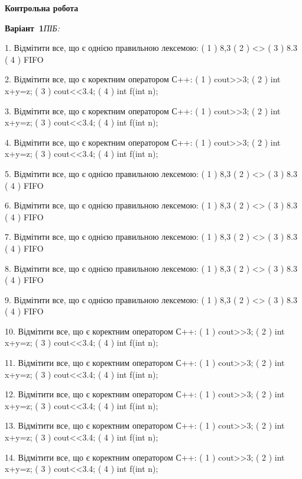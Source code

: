 \documentclass[11pt]{article}
\begin{document}
{\large\textbf{Контрольна робота}}

\textbf{Варіант \No\,1}\hfill \textit{ПІБ:}\,\underline{\hspace{60mm}}
\vspace{4mm}

1. Відмітити все, що є однією правильною лексемою:
( 1 ) 8,3	
( 2 ) <>	
( 3 ) 8.3	
( 4 ) FIFO

2. Відмітити все, що є коректним оператором С++:
( 1 ) cout>>3;	
( 2 ) int x+y=z;	
( 3 ) cout<<3.4;	
( 4 ) int f(int n);

3. Відмітити все, що є коректним оператором С++:
( 1 ) cout>>3;	
( 2 ) int x+y=z;	
( 3 ) cout<<3.4;	
( 4 ) int f(int n);

4. Відмітити все, що є коректним оператором С++:
( 1 ) cout>>3;	
( 2 ) int x+y=z;	
( 3 ) cout<<3.4;	
( 4 ) int f(int n);

5. Відмітити все, що є однією правильною лексемою:
( 1 ) 8,3	
( 2 ) <>	
( 3 ) 8.3	
( 4 ) FIFO

6. Відмітити все, що є однією правильною лексемою:
( 1 ) 8,3	
( 2 ) <>	
( 3 ) 8.3	
( 4 ) FIFO

7. Відмітити все, що є однією правильною лексемою:
( 1 ) 8,3	
( 2 ) <>	
( 3 ) 8.3	
( 4 ) FIFO

8. Відмітити все, що є однією правильною лексемою:
( 1 ) 8,3	
( 2 ) <>	
( 3 ) 8.3	
( 4 ) FIFO

9. Відмітити все, що є однією правильною лексемою:
( 1 ) 8,3	
( 2 ) <>	
( 3 ) 8.3	
( 4 ) FIFO

10. Відмітити все, що є коректним оператором С++:
( 1 ) cout>>3;	
( 2 ) int x+y=z;	
( 3 ) cout<<3.4;	
( 4 ) int f(int n);

11. Відмітити все, що є коректним оператором С++:
( 1 ) cout>>3;	
( 2 ) int x+y=z;	
( 3 ) cout<<3.4;	
( 4 ) int f(int n);

12. Відмітити все, що є коректним оператором С++:
( 1 ) cout>>3;	
( 2 ) int x+y=z;	
( 3 ) cout<<3.4;	
( 4 ) int f(int n);

13. Відмітити все, що є коректним оператором С++:
( 1 ) cout>>3;	
( 2 ) int x+y=z;	
( 3 ) cout<<3.4;	
( 4 ) int f(int n);

14. Відмітити все, що є коректним оператором С++:
( 1 ) cout>>3;	
( 2 ) int x+y=z;	
( 3 ) cout<<3.4;	
( 4 ) int f(int n);
\end{document}
